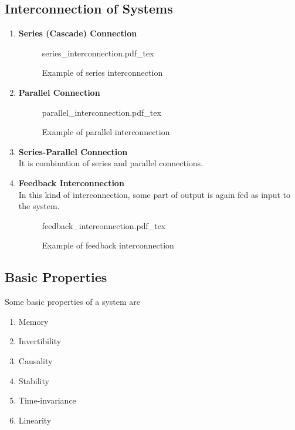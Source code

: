 \documentclass[oneside]{book}
\newcommand{\incfig}[1]{%
    {#1.pdf_tex}
}
\begin{document}
\subsection{Interconnection of Systems}
\begin{enumerate}
  \item \textbf{Series (Cascade) Connection}
        \begin{figure}[ht]
          \centering
          \incfig{series_interconnection}
          \caption{Example of series interconnection}
        \end{figure}
  \item \textbf{Parallel Connection}
        \begin{figure}[ht]
          \centering
          \incfig{parallel_interconnection}
          \caption{Example of parallel interconnection}
        \end{figure}
  \item \textbf{Series-Parallel Connection}\\
        It is combination of series and parallel connections.
  \item \textbf{Feedback Interconnection}\\
        In this kind of interconnection, some part of output is again fed as input to the system.
        \begin{figure}[ht]
          \centering
          \incfig{feedback_interconnection}
          \caption{Example of feedback interconnection}
        \end{figure}
\end{enumerate}

\subsection{Basic Properties}
Some basic properties of a system are
\begin{enumerate}
  \item Memory
  \item Invertibility
  \item Causality
  \item Stability
  \item Time-invariance
  \item Linearity
\end{enumerate}



\end{document}
